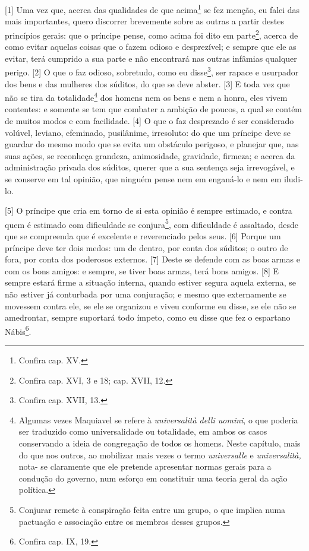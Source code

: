 {[}1{]} Uma vez que, acerca das qualidades de que acima\footnote{Confira
  cap. XV.} se fez menção, eu falei das mais importantes, quero
discorrer brevemente sobre as outras a partir destes princípios gerais:
que o príncipe pense, como acima foi dito em parte\footnote{Confira cap.
  XVI, 3 e 18; cap. XVII, 12.}, acerca de como evitar aquelas coisas que
o fazem odioso e desprezível; e sempre que ele as evitar, terá cumprido
a sua parte e não encontrará nas outras infâmias qualquer perigo.
{[}2{]} O que o faz odioso, sobretudo, como eu disse\footnote{Confira
  cap. XVII, 13.}, ser rapace e usurpador dos bens e das mulheres dos
súditos, do que se deve abster. {[}3{]} E toda vez que não se tira da
totalidade\footnote{Algumas vezes Maquiavel se refere à
  \emph{universalità delli uomini}, o que poderia ser traduzido como
  universalidade ou totalidade, em ambos os casos conservando a ideia de
  congregação de todos os homens. Neste capítulo, mais do que nos
  outros, ao mobilizar mais vezes o termo \emph{universalle} e
  \emph{universalità,} nota- se claramente que ele pretende apresentar
  normas gerais para a condução do governo, num esforço em constituir
  uma teoria geral da ação política.} dos homens nem os bens e nem a
honra, eles vivem contentes: e somente se tem que combater a ambição de
poucos, a qual se contém de muitos modos e com facilidade. {[}4{]} O que
o faz desprezado é ser considerado volúvel, leviano, efeminado,
pusilânime, irresoluto: do que um príncipe deve se guardar do mesmo modo
que se evita um obstáculo perigoso, e planejar que, nas suas ações, se
reconheça grandeza, animosidade, gravidade, firmeza; e acerca da
administração privada dos súditos, querer que a sua sentença seja
irrevogável, e se conserve em tal opinião, que ninguém pense nem em
enganá-lo e nem em iludi-lo.

{[}5{]} O príncipe que cria em torno de si esta opinião é sempre
estimado, e contra quem é estimado com dificuldade se conjura\footnote{Conjurar
  remete à conspiração feita entre um grupo, o que implica numa
  pactuação e associação entre os membros desses grupos.}, com
dificuldade é assaltado, desde que se compreenda que é excelente e
reverenciado pelos seus. {[}6{]} Porque um príncipe deve ter dois medos:
um de dentro, por conta dos súditos; o outro de fora, por conta dos
poderosos externos. {[}7{]} Deste se defende com as boas armas e com os
bons amigos: e sempre, se tiver boas armas, terá bons amigos. {[}8{]} E
sempre estará firme a situação interna, quando estiver segura aquela
externa, se não estiver já conturbada por uma conjuração; e mesmo que
externamente se movessem contra ele, se ele se organizou e viveu
conforme eu disse, se ele não se amedrontar, sempre suportará todo
ímpeto, como eu disse que fez o espartano Nábis\footnote{Confira cap.
  IX, 19.}.

